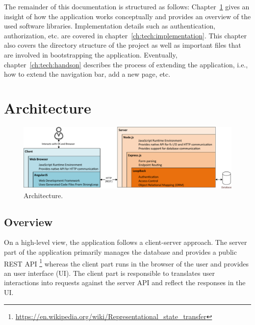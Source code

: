 \documentclass[nochapterpage,nopartpage,noheadingspace,numbersubsubsec,bigchapter,colorback,accentcolor=tud9c,10pt]{tudreport}
\begin{document}
    The remainder of this documentation is structured as follows: Chapter~\ref{ch:tech:architecture} gives an insight of how the application works conceptually and provides an overview of the used software libraries. Implementation details such as authentication, authorization, etc. are covered in chapter~\ref{ch:tech:implementation}. This chapter also covers the directory structure of the project as well as important files that are involved in bootstrapping the application. Eventually, chapter~\ref{ch:tech:handson} describes the process of extending the application, i.e., how to extend the navigation bar, add a new page, etc.

  \chapter{Architecture}
  \label{ch:tech:architecture}

        \begin{figure}[!ht]
            \centering
            \includegraphics[width=\textwidth]{architecture-horizontal}
            \caption{Architecture.}
            \label{fig:architecture}
        \end{figure}

  \section{Overview}
  \label{sec:tech:architecture:overview}
    On a high-level view, the application follows a client-server approach. The server part of the application primarily manages the database and provides a public REST API%
    \footnote{\url{https://en.wikipedia.org/wiki/Representational_state_transfer}}
    whereas the client part runs in the browser of the user and provides an user interface (UI). The client part is responsible to translates user interactions into requests against the server API and reflect the responses in the UI.
\end{document}
